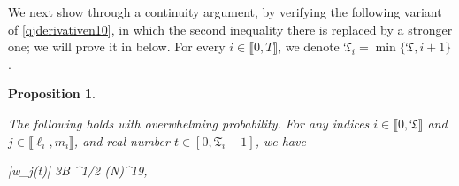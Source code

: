 \documentclass{amsart}
\numberwithin{equation}{section}
\newtheorem{prop}[thm]{Proposition}
\theoremstyle{remark}
\theoremstyle{definition}
\begin{document}
 		We next show  through a continuity argument, by verifying the following variant of \eqref{qjderivativen10}, in which the second inequality there is replaced by a stronger one; we will prove it in  below. For every $i \in \llbracket 0, T \rrbracket$, we denote $\mathfrak{T}_i = \min \{ \mathfrak{T}, i+1 \}$. 
 		
 		
 		\begin{prop} 
 			
 			\label{wjt} 
 			
 			The following holds with overwhelming probability. For any indices $i \in \llbracket 0, \mathfrak{T}  \rrbracket$ and $j \in \llbracket \ell_i, m_i \rrbracket$, and real number $t \in [0, \mathfrak{T}_i - 1]$, we have 
 			\begin{flalign}
 				\label{qjt3} 
 				 |w_j(t)| \le 3B ^{1/2} (\log N)^{19},
 			\end{flalign} 
 		\end{prop} 
 		
\end{document}

